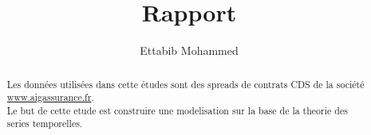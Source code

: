 \documentclass{Math}
\begin{document}
\frontmatter
\title{Rapport}
\author{Ettabib Mohammed}
\maketitle
\mainmatter

    \french
  \begin{abstract}
      Les données utilisées dans cette études sont des spreads de contrats CDS
      de la société \url{www.aigassurance.fr}. \\
      Le but de cette etude est construire une modelisation sur la base de la
      theorie des series temporelles.\\
  \end{abstract}


\backmatter
\tableofcontents
\end{document}
